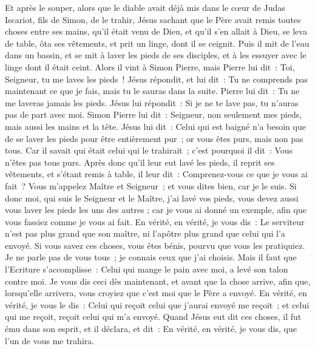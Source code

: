 \begin{multicols}{2}
Et après le souper, alors que le diable avait déjà mis dans le cœur de Judas Iscariot, fils de Simon, de le trahir,
Jésus sachant que le Père avait remis toutes choses entre ses mains, qu'il était venu de Dieu, et qu'il s'en allait à Dieu,
se leva de table, ôta ses vêtements, et prit un linge, dont il se ceignit.
Puis il mit de l'eau dans un bassin, et se mit à laver les pieds de ses disciples, et à les essuyer avec le linge dont il était ceint.
Alors il vint à Simon Pierre, mais Pierre lui dit~: Toi, Seigneur, tu me laves les pieds~!
Jésus répondit, et lui dit~: Tu ne comprends pas maintenant ce que je fais, mais tu le sauras dans la suite.
Pierre lui dit~: Tu ne me laveras jamais les pieds. Jésus lui répondit~: Si je ne te lave pas, tu n'auras pas de part avec moi.
Simon Pierre lui dit~: Seigneur, non seulement mes pieds, mais aussi les mains et la tête.
Jésus lui dit~: Celui qui est baigné n'a besoin que de se laver les pieds pour être entièrement pur~; or vous êtes purs, mais non pas tous.
Car il savait qui était celui qui le trahirait~; c'est pourquoi il dit~: Vous n'êtes pas tous purs.
Après donc qu'il leur eut lavé les pieds, il reprit ses vêtements, et s'étant remis à table, il leur dit~: Comprenez-vous ce que je vous ai fait~?
Vous m'appelez Maître et Seigneur~; et vous dites bien, car je le suis.
Si donc moi, qui suis le Seigneur et le Maître, j'ai lavé vos pieds, vous devez aussi vous laver les pieds les uns des autres ;
car je vous ai donné un exemple, afin que vous fassiez comme je vous ai fait.
En vérité, en vérité, je vous dis~: Le serviteur n'est pas plus grand que son maître, ni l'apôtre plus grand que celui qui l'a envoyé.
Si vous savez ces choses, vous êtes bénis, pourvu que vous les pratiquiez.
Je ne parle pas de vous tous~; je connais ceux que j'ai choisis. Mais il faut que l'Ecriture s'accomplisse~: Celui qui mange le pain avec moi, a levé son talon contre moi.
Je vous dis ceci dès maintenant, et avant que la chose arrive, afin que, lorsqu'elle arrivera, vous croyiez que c'est moi que le Père a envoyé.
En vérité, en vérité, je vous le dis~: Celui qui reçoit celui que j'aurai envoyé me reçoit~; et celui qui me reçoit, reçoit celui qui m'a envoyé.
Quand Jésus eut dit ces choses, il fut ému dans son esprit, et il déclara, et dit~: En vérité, en vérité, je vous dis, que l'un de vous me trahira.

\end{multicols}
